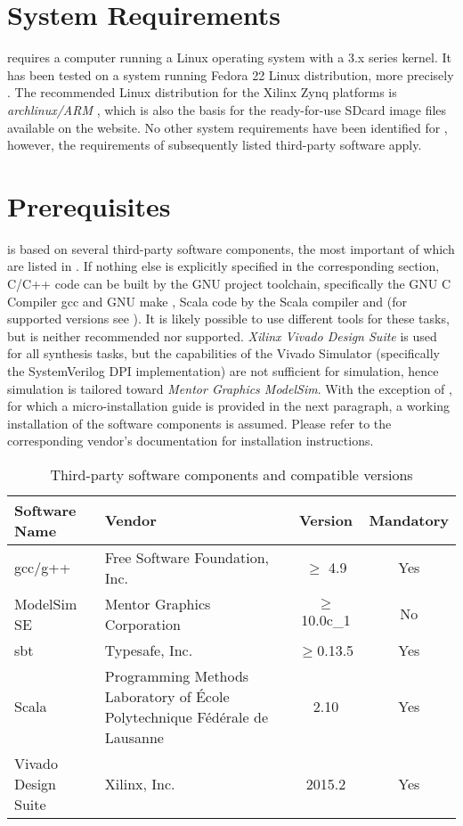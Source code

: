 \section{System Requirements}
\tpc{} requires a computer running a \textsf{Linux} operating system with a 3.x series kernel.
It has been tested on a system running Fedora 22 Linux distribution, more precisely .
The recommended Linux distribution for the Xilinx Zynq platforms is \emph{archlinux/ARM} \cite{archlinuxarm}, which is also the basis for the ready-for-use SDcard image files available on the \tpc{} website.
No other system requirements have been identified for \tpc{}, however, the requirements of subsequently listed third-party software apply.

\section{Prerequisites}
\tpc{} is based on several third-party software components, the most important of which are listed in .
If nothing else is explicitly specified in the corresponding section, C/C++ code can be built by the GNU project toolchain, specifically the GNU C Compiler gcc \cite{gcc} and GNU make \cite{gmake}, Scala code by the Scala compiler \cite{scala} and  \cite{sbt} (for supported versions see ).
It is likely possible to use different tools for these tasks, but is neither recommended nor supported.
\emph{Xilinx Vivado Design Suite} is used for all synthesis tasks, but the capabilities of the Vivado Simulator (specifically the SystemVerilog DPI implementation) are not sufficient for simulation, hence simulation is tailored toward \emph{Mentor Graphics ModelSim}.
With the exception of , for which a micro-installation guide is provided in the next paragraph, a working installation of the software components is assumed.
Please refer to the corresponding vendor's documentation for installation instructions.

\begin{longtable}[c]{llcc}
  \caption{Third-party software components and compatible versions}
  \label{tbl:thirdparty}\\
  \toprule
  \textbf{Software Name} & \textbf{Vendor} & \textbf{Version} & \textbf{Mandatory}\\\midrule
  \endhead
  \bottomrule
  \endlastfoot
  gcc/g++ & Free Software Foundation, Inc. & $\geq$ 4.9 & Yes\\\midrule
  ModelSim SE & Mentor Graphics Corporation & $\geq$ 10.0c\_1 & No\\\midrule
  sbt & Typesafe, Inc. & $\geq$0.13.5 & Yes\\\midrule
  Scala & \begin{minipage}{5cm}Programming Methods Laboratory of École Polytechnique Fédérale de Lausanne\end{minipage} & 2.10 & Yes\\\midrule
  Vivado Design Suite & Xilinx, Inc. & 2015.2 & Yes\\
\end{longtable}

